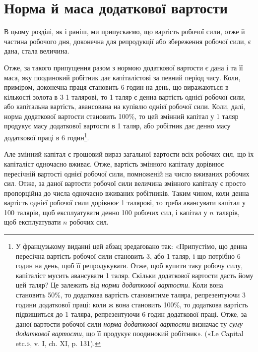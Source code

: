 
\section{Норма й маса додаткової вартости}

В цьому розділі, як і раніш, ми припускаємо, що вартість
робочої сили, отже й частина робочого дня, доконечна для репродукції
або збереження робочої сили, є дана, стала величина.

Отже, за такого припущення разом з нормою додаткової вартости
є дана і та її маса, яку поодинокий робітник дає капіталістові
за певний період часу. Коли, приміром, доконечна праця
становить 6 годин на день, що виражаються в кількості золота
в 3 \deq{} 1 талярові, то 1 таляр є денна вартість однієї
робочої сили, або капітальна вартість, авансована на купівлю
однієї робочої сили. Коли, далі, норма додаткової вартости становить
100\%, то цей змінний капітал у 1 таляр продукує масу
додаткової вартости в 1 таляр, або робітник дає денно масу додаткової
праці в 6 годин\footnote*{
У французькому виданні цей абзац зредаґовано так: «Припустімо,
що денна пересічна вартість робочої сили становить 3, або 1 таляр,
і що потрібно 6 годин на день, щоб її репродукувати. Отже, щоб
купити таку робочу силу, капіталіст мусить авансувати 1 таляр. Скільки
додаткової вартости дасть йому цей таляр? Це залежить від \emph{норми додаткової
вартости}. Коли вона становить 50\%, то додаткова вартість становитиме
 таляра, репрезентуючи 3 години додаткової праці: коли ж вона
становить 100\%, то додаткова вартість підвищиться до 1 таляра, репрезентуючи
6 годин додаткової праці. Отже, за даної вартости робочої сили
\emph{норма додаткової вартости} визначає ту \emph{суму додаткової вартости}, що її
продукує поодинокий робітник». («Le Capital etc.», v. I, ch. XI, p. 131). \Red
}.

Але змінний капітал є грошовий вираз загальної вартости всіх
робочих сил, що їх капіталіст одночасно вживає. Отже, вартість
змінного капіталу дорівнює пересічній вартості однієї робочої
сили, помноженій на число вживаних робочих сил. Отже, за даної
вартости робочої сили величина змінного капіталу є просто пропорційна
до числа одночасно вживаних робітників. Таким чином,
коли денна вартість однієї робочої сили дорівнює 1 талярові, то
треба авансувати капітал у 100 талярів, щоб експлуатувати денно
100 робочих сил, і капітал у $n$ талярів, щоб експлуатувати $n$ робочих
сил.

